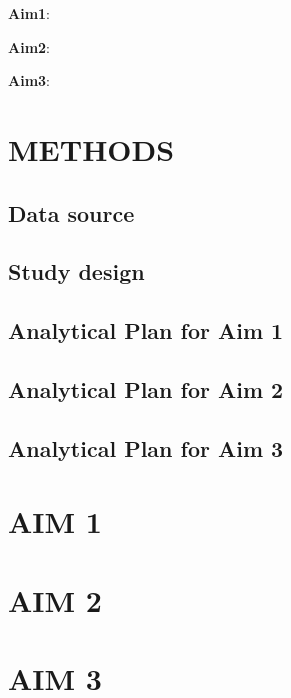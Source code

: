 \documentclass[12pt]{book}
\numberwithin{equation}{chapter}
\begin{document}
\textbf{Aim1}:

\textbf{Aim2}:

\textbf{Aim3}:

\hypertarget{methods}{%
\chapter{METHODS}\label{methods}}

\hypertarget{data-source}{%
\section{Data source}\label{data-source}}

\hypertarget{study-design}{%
\section{Study design}\label{study-design}}

\hypertarget{analytical-plan-for-aim-1}{%
\section{Analytical Plan for Aim 1}\label{analytical-plan-for-aim-1}}

\hypertarget{analytical-plan-for-aim-2}{%
\section{Analytical Plan for Aim 2}\label{analytical-plan-for-aim-2}}

\hypertarget{analytical-plan-for-aim-3}{%
\section{Analytical Plan for Aim 3}\label{analytical-plan-for-aim-3}}

\hypertarget{aim-1}{%
\chapter{AIM 1}\label{aim-1}}

\hypertarget{aim-2}{%
\chapter{AIM 2}\label{aim-2}}

\hypertarget{aim-3}{%
\chapter{AIM 3}\label{aim-3}}
\end{document}
